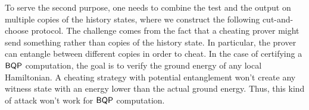 To serve the second purpose, one needs to combine the test and the output on multiple copies of the history states, where we construct the following cut-and-choose protocol.  
The challenge comes from the fact that a cheating prover might send something rather than copies of the history state. 
In particular, the prover can entangle between different copies in order to cheat. 
In the case of certifying a $\operatorname{\mathsf{BQP}}$ computation, the goal is to verify the ground energy of any local Hamiltonian. 
A cheating strategy with potential entanglement won't create any witness state with an energy lower than the actual ground energy. 
Thus, this kind of attack won't work for $\operatorname{\mathsf{BQP}}$ computation. 

